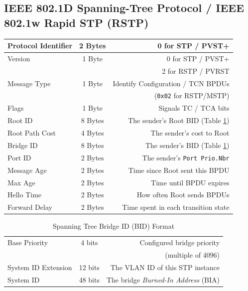 \documentclass[12pt]{article}
\begin{document}
	\subsection{IEEE 802.1D Spanning-Tree Protocol / IEEE 802.1w Rapid STP (RSTP) \label{subsec:802.1D/w}}
	\begin{table}[H]
	\centering
	\begin{tabular}{| l | c | r |}
	\hline
	Protocol Identifier		& 2 Bytes	& 0 for STP / PVST+\\\hline
	Version			& 1 Byte	& 0 for STP / PVST+\\
					&		& 2 for RSTP / PVRST\\\hline
	Message Type		& 1 Byte	& Identify Configuration / TCN BPDUs\\
					&		& (\texttt{0x02} for RSTP/MSTP)\\\hline
	Flags				& 1 Byte	& Signals TC / TCA bits\\\hline
	Root ID			& 8 Bytes	& The sender's Root BID (Table \ref{tab:BID})\\\hline
	Root Path Cost		& 4 Bytes	& The sender's cost to Root\\\hline
	Bridge ID			& 8 Bytes	& The sender's BID (Table \ref{tab:BID})\\\hline
	Port ID			& 2 Bytes	& The sender's \texttt{Port Prio.Nbr}\\\hline
	Message Age		& 2 Bytes	& Time since Root sent this BPDU\\\hline
	Max Age			& 2 Bytes	& Time until BPDU expires\\\hline
	Hello Time			& 2 Bytes	& How often Root sends BPDUs\\\hline
	Forward Delay		& 2 Bytes	& Time spent in each transition state\\\hline
	\end{tabular}\end{table}

	\begin{table}[H]
	\centering
	\caption{Spanning Tree Bridge ID (BID) Format \label{tab:BID}}
	\begin{tabular}{| l | c | r |}
	\hline
	Base Priority		& 4 bits	& Configured bridge priority\\
					&		& (multiple of 4096)\\\hline
	System ID Extension	& 12 bits	& The VLAN ID of this STP instance\\\hline
	System ID			& 48 bits	& The bridge \textit{Burned-In Address} (BIA)\\\hline
	\end{tabular}\end{table}
\end{document}
